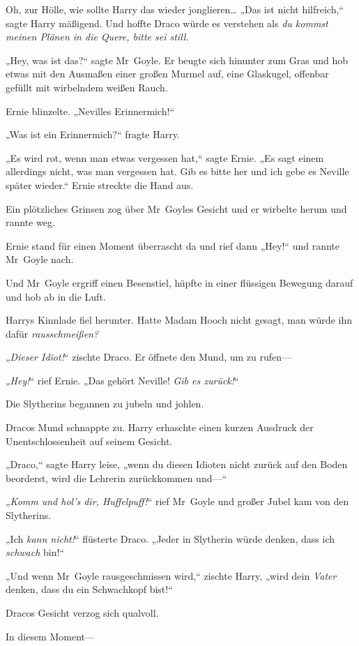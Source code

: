 {Oh, zur Hölle, wie sollte Harry das wieder jonglieren… „Das ist nicht hilfreich,“ sagte Harry mäßigend. Und hoffte Draco würde es verstehen als \emph{du kommst meinen Plänen in die Quere, bitte sei still.}

„Hey, was ist das?“ sagte Mr~Goyle. Er beugte sich hinunter zum Gras und hob etwas mit den Ausmaßen einer großen Murmel auf, eine Glaskugel, offenbar gefüllt mit wirbelndem weißen Rauch.

Ernie blinzelte. „Nevilles Erinnermich!“

„Was ist ein Erinnermich?“ fragte Harry.

„Es wird rot, wenn man etwas vergessen hat,“ sagte Ernie. „Es sagt einem allerdings nicht, was man vergessen hat. Gib es bitte her und ich gebe es Neville später wieder.“ Ernie streckte die Hand aus.

Ein plötzliches Grinsen zog über Mr~Goyles Gesicht und er wirbelte herum und rannte weg.

Ernie stand für einen Moment überrascht da und rief dann „Hey!“ und rannte Mr~Goyle nach.

Und Mr~Goyle ergriff einen Besenstiel, hüpfte in einer flüssigen Bewegung darauf und hob ab in die Luft.

Harrys Kinnlade fiel herunter. Hatte Madam Hooch nicht gesagt, man würde ihn dafür \emph{rausschmeißen?}

„\emph{Dieser Idiot!}“ zischte Draco. Er öffnete den Mund, um zu rufen—

„\emph{Hey!}“ rief Ernie. „Das gehört Neville! \emph{Gib es zurück!}“

Die Slytherins begannen zu jubeln und johlen.

Dracos Mund schnappte zu. Harry erhaschte einen kurzen Ausdruck der Unentschlossenheit auf seinem Gesicht.

„Draco,“ sagte Harry leise, „wenn du diesen Idioten nicht zurück auf den Boden beorderst, wird die Lehrerin zurückkommen und—“

„\emph{Komm und hol's dir, Huffelpuff!}“ rief Mr~Goyle und großer Jubel kam von den Slytherins.

„Ich \emph{kann nicht!}“ flüsterte Draco. „Jeder in Slytherin würde denken, dass ich \emph{schwach} bin!“

„Und wenn Mr~Goyle rausgeschmissen wird,“ zischte Harry, „wird dein \emph{Vater} denken, dass du ein Schwachkopf bist!“

Dracos Gesicht verzog sich qualvoll.

In diesem Moment—

}
